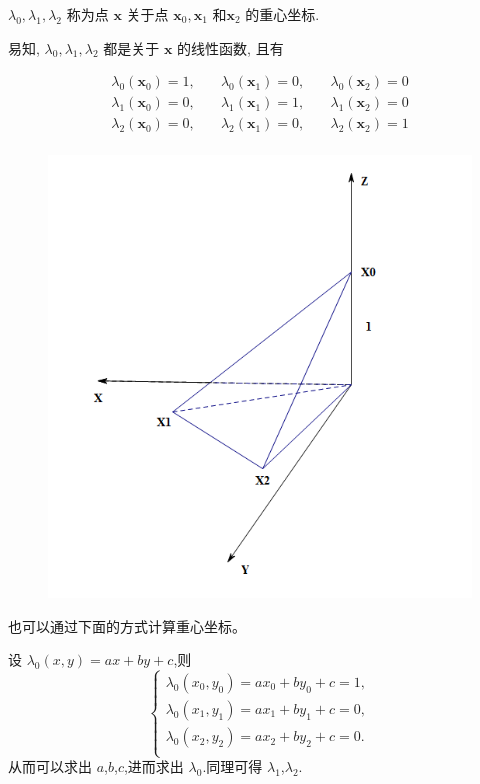 \documentclass[12pt,a4paper]{article}
\begin{document}
$\lambda_0,\lambda_1,\lambda_2$ 称为点 $\mathbf{x}$ 关于点 $\mathbf{x}_0,\mathbf{x}_1$ 和$\mathbf{x}_2$ 的重心坐标. 

易知, $\lambda_0, \lambda_1, \lambda_2$ 都是关于 $\mathbf x$ 的线性函数, 且有

\begin{eqnarray*}
\lambda_0(\mathbf x_0) = 1,\quad & \lambda_0(\mathbf x_1) = 0,\quad& \lambda_0(\mathbf x_2) = 0\\
\lambda_1(\mathbf x_0) = 0,\quad & \lambda_1(\mathbf x_1) = 1,\quad& \lambda_1(\mathbf x_2) = 0\\
\lambda_2(\mathbf x_0) = 0,\quad & \lambda_2(\mathbf x_1) = 0,\quad & \lambda_2(\mathbf x_2) = 1\\
\end{eqnarray*}

\begin{figure}[H]
\centering
\includegraphics[scale=0.7]{./figures/3.png}
\caption{}
\end{figure}

也可以通过下面的方式计算重心坐标。

设 $\lambda_0 (x,y)=ax+by+c$,则
$$
\begin{cases}
\lambda _0 (x_0,y_0)=ax_0+by_0+c=1,\\
\lambda _0 (x_1,y_1)=ax_1+by_1+c=0,\\
\lambda _0 (x_2,y_2)=ax_2+by_2+c=0.\\
\end{cases}
$$
从而可以求出 $a$,$b$,$c$,进而求出 $\lambda _0$.同理可得 $\lambda _1$,$\lambda _2$.
\end{document}
